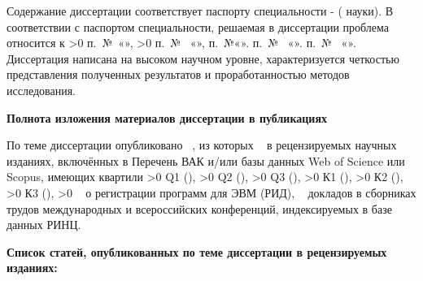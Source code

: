     Содержание диссертации соответствует паспорту специальности   -  ( науки). В соответствии с паспортом специальности, решаемая в диссертации проблема относится к 
    \ifnum\value{apitemm}>0
        п.~№\theapitem~«»,
        \ifnum\value{apitemmm}>0
            п.~№\theapitemm~ «», п.~№\theapitemmm «».
        \else
            п.~№\theapitemm~ «».
        \fi
    \else
        п.~№\theapitem~ «».
    \fi
    Диссертация написана на высоком научном уровне, характеризуется четкостью представления полученных результатов и проработанностью методов исследования.
    
    \vspace{3mm}

    \textbf{Полнота изложения материалов диссертации в публикациях}

    \vspace{3mm}
    
    По теме диссертации опубликовано \theaant~\numtotexWorks{\value{aant}}, из которых \theaanr~\numtotexArticles{\value{aanr}} в рецензируемых научных изданиях, включённых в Перечень ВАК и/или базы данных Web of Science или Scopus, имеющих квартили  
    \ifnum\value{aaq}>0
        Q1 (\theaaq),
    \fi
    \ifnum\value{aaqq}>0
        Q2 (\theaaqq),
    \fi
    \ifnum\value{aaqqq}>0
        Q3 (\theaaqqq),
    \fi
    \ifnum\value{aak}>0
        К1 (\theaak),
    \fi
    \ifnum\value{aakk}>0
        К2 (\theaakk),
    \fi
        \ifnum\value{aakkk}>0
        К3 (\theaakkk),
    \fi
    \ifnum\value{aarid}>0
        \theaarid~\numtotexCertificate{\value{aarid}} о регистрации программ для ЭВМ (РИД),
    \fi
    \theaat~\numtotexThesis{\value{aat}} докладов в сборниках трудов международных и всероссийских конференций, индексируемых в базе данных РИНЦ.

    \vspace{3mm}
    
    \textbf{Список статей, опубликованных по теме диссертации в рецензируемых изданиях:}

    \vspace{3mm}

    \begin{enumerate}
        {%
            \item {} \textbf{}\
        }
        \setcounter{enumtemp}{\theenumi}
    \end{enumerate}

